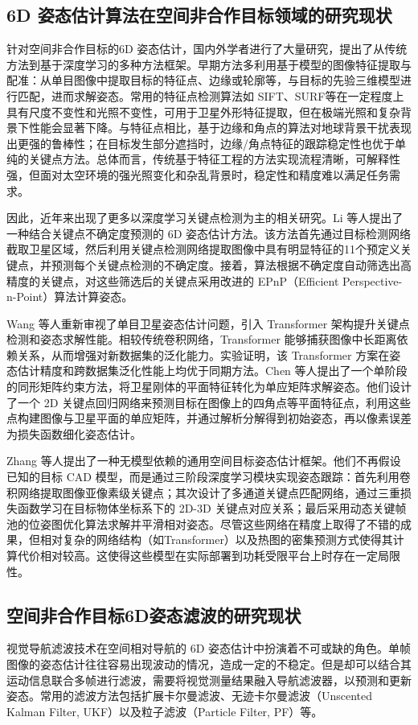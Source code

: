 \subsection{6D 姿态估计算法在空间非合作目标领域的研究现状}
针对空间非合作目标的6D 姿态估计，国内外学者进行了大量研究，提出了从传统方法到基于深度学习的多种方法框架。早期方法多利用基于模型的图像特征提取与配准：从单目图像中提取目标的特征点、边缘或轮廓等，与目标的先验三维模型进行匹配，进而求解姿态。常用的特征点检测算法如 SIFT\cite{sift}、SURF\cite{bay2006surf}等在一定程度上具有尺度不变性和光照不变性，可用于卫星外形特征提取，但在极端光照和复杂背景下性能会显著下降。与特征点相比，基于边缘和角点的算法对地球背景干扰表现出更强的鲁棒性；在目标发生部分遮挡时，边缘/角点特征的跟踪稳定性也优于单纯的关键点方法。总体而言，传统基于特征工程的方法实现流程清晰，可解释性强，但面对太空环境的强光照变化和杂乱背景时，稳定性和精度难以满足任务需求。

因此，近年来出现了更多以深度学习关键点检测为主的相关研究。Li 等人提出了一种结合关键点不确定度预测的 6D 姿态估计方法\cite{aerospace9100592}。该方法首先通过目标检测网络截取卫星区域，然后利用关键点检测网络提取图像中具有明显特征的11个预定义关键点，并预测每个关键点检测的不确定度。接着，算法根据不确定度自动筛选出高精度的关键点，对这些筛选后的关键点采用改进的 EPnP（Efficient Perspective-n-Point）算法计算姿态。

Wang 等人重新审视了单目卫星姿态估计问题，引入 Transformer 架构提升关键点检测和姿态求解性能\cite{s23208633}。相较传统卷积网络，Transformer 能够捕获图像中长距离依赖关系，从而增强对新数据集的泛化能力。实验证明，该 Transformer 方案在姿态估计精度和跨数据集泛化性能上均优于同期方法。Chen 等人提出了一个单阶段的同形矩阵约束方法，将卫星刚体的平面特征转化为单应矩阵求解姿态\cite{chen2024spacecraft}。他们设计了一个 2D 关键点回归网络来预测目标在图像上的四角点等平面特征点，利用这些点构建图像与卫星平面的单应矩阵，并通过解析分解得到初始姿态，再以像素误差为损失函数细化姿态估计。

Zhang 等人提出了一种无模型依赖的通用空间目标姿态估计框架\cite{zhang2025robust}。他们不再假设已知的目标 CAD 模型，而是通过三阶段深度学习模块实现姿态跟踪：首先利用卷积网络提取图像亚像素级关键点；其次设计了多通道关键点匹配网络，通过三重损失函数学习在目标物体坐标系下的 2D-3D 关键点对应关系；最后采用动态关键帧池的位姿图优化算法求解并平滑相对姿态。尽管这些网络在精度上取得了不错的成果，但相对复杂的网络结构（如Transformer）以及热图的密集预测方式使得其计算代价相对较高。这使得这些模型在实际部署到功耗受限平台上时存在一定局限性。

\subsection{空间非合作目标6D姿态滤波的研究现状}
视觉导航滤波技术在空间相对导航的 6D 姿态估计中扮演着不可或缺的角色。单帧图像的姿态估计往往容易出现波动的情况，造成一定的不稳定。但是却可以结合其运动信息联合多帧进行滤波，需要将视觉测量结果融入导航滤波器，以预测和更新姿态。常用的滤波方法包括扩展卡尔曼滤波、无迹卡尔曼滤波（Unscented Kalman Filter, UKF）以及粒子滤波（Particle Filter, PF）等。

